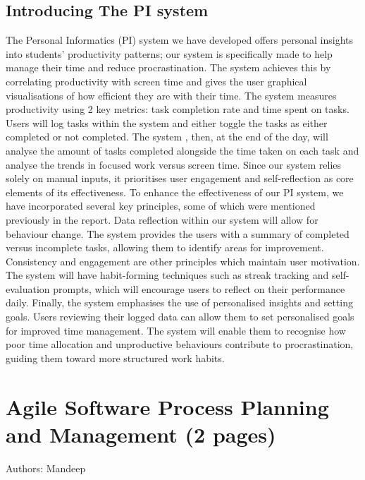 \documentclass[12pt,a4paper]{article}
\begin{document}
\subsection{Introducing The PI system}
The Personal Informatics (PI) system we have developed offers personal insights into students' productivity patterns; our system is specifically made to help manage their time and reduce procrastination. The system achieves this by correlating productivity with screen time and gives the user graphical visualisations of how efficient they are with their time. The system measures productivity using 2 key metrics: task completion rate and time spent on tasks. Users will log tasks within the system and either toggle the tasks as either completed or not completed. The system , then, at the end of the day, will analyse the amount of tasks completed alongside the time taken on each task and analyse the trends in focused work versus screen time. Since our system relies solely on manual inputs, it prioritises user engagement and self-reflection as core elements of its effectiveness. To enhance the effectiveness of our PI system, we have incorporated several key principles, some of which were mentioned previously in the report. Data reflection within our system will allow for behaviour change. The system provides the users with a summary of completed versus incomplete tasks, allowing them to identify areas for improvement. Consistency and engagement are other principles which maintain user motivation. The system will have habit-forming techniques such as streak tracking and self-evaluation prompts, which will encourage users to reflect on their performance daily. Finally, the system emphasises the use of personalised insights and setting goals. Users reviewing their logged data can allow them to set personalised goals for improved time management. The system will enable them to recognise how poor time allocation and unproductive behaviours contribute to procrastination, guiding them toward more structured work habits.



\label{sec:intro}


\section{Agile Software Process Planning and Management (2 pages)}
Authors: Mandeep
\end{document}
